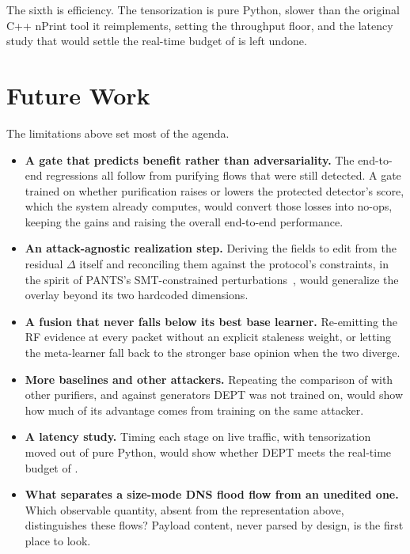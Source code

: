 The sixth is efficiency. The tensorization is pure Python, slower than the original
C++ nPrint tool it reimplements, setting the throughput floor, and the latency study that would
settle the real-time budget of  is left undone.

\section{Future Work}\label{sec:concl-future}

The limitations above set most of the agenda.

\begin{itemize}
    \item \textbf{A gate that predicts benefit rather than adversariality.} The end-to-end
    regressions all follow from purifying flows that were still detected. A gate trained on
    whether purification raises or lowers the protected detector's score, which the system already
    computes, would convert those losses into no-ops, keeping the gains and raising the overall end-to-end performance.
    \item \textbf{An attack-agnostic realization step.} Deriving the fields to edit from the
    residual $\Delta$ itself and reconciling them against the protocol's constraints, in the
    spirit of PANTS's SMT-constrained perturbations~\cite{jin2025robustifying}, would generalize the
    overlay beyond its two hardcoded dimensions.
    \item \textbf{A fusion that never falls below its best base learner.} Re-emitting the \ac{RF}
    evidence at every packet without an explicit staleness weight, or letting the meta-learner fall back
    to the stronger base opinion when the two diverge.
    \item \textbf{More baselines and other attackers.} Repeating the comparison of
     with other purifiers, and against generators DEPT was not trained on,
    would show how much of its advantage comes from training on the same attacker.
    \item \textbf{A latency study.} Timing each stage on live traffic, with tensorization
    moved out of pure Python, would show whether DEPT meets the real-time budget of
    .
    \item \textbf{What separates a size-mode DNS flood flow from an unedited one.} Which observable quantity,
    absent from the representation above, distinguishes these flows? Payload content, never parsed by design,
    is the first place to look.
\end{itemize}

